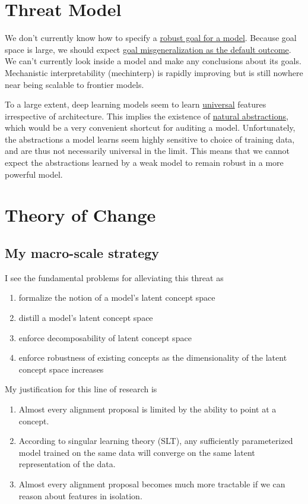 
\section{Threat Model}

We don't currently know how to specify a \hyperlink{https://arbital.com/p/diamond_maximizer/}{robust goal for a model}.
Because goal space is large, we should expect
\hyperlink{https://www.lesswrong.com/s/r9tYkB2a8Fp4DN8yB/p/FkgsxrGf3QxhfLWHG}{goal misgeneralization as the default outcome}.
We can't currently look inside a model and make any conclusions about its goals.
Mechanistic interpretability (mechinterp) is rapidly improving but is still nowhere near being scalable to frontier models.

To a large extent, deep learning models seem to learn \hyperlink{}{universal} features irrespective of architecture.
This implies the existence of
\hyperlink{https://www.lesswrong.com/posts/gvzW46Z3BsaZsLc25/natural-abstractions-key-claims-theorems-and-critiques-1}{natural abstractions},
which would be a very convenient shortcut for auditing a model.
Unfortunately, the abstractions a model learns seem highly sensitive to choice of training data, and are thus not necessarily universal in the limit.
This means that we cannot expect the abstractions learned by a weak model to remain robust in a more powerful model.

\section{Theory of Change}
\label{sec:2}

\subsection{My macro-scale strategy}
I see the fundamental problems for alleviating this threat as

\begin{enumerate}
  \item formalize the notion of a model's latent concept space
  \item distill a model's latent concept space
  \item enforce decomposability of latent concept space
  \item enforce robustness of existing concepts as the dimensionality of the latent concept space increases
\end{enumerate}

My justification for this line of research is
\begin{enumerate}
\item Almost every alignment proposal is limited by the ability to point at a concept.
\item According to singular learning theory (SLT), any sufficiently parameterized model trained on the same data will converge on the same latent representation of the data.
\item Almost every alignment proposal becomes much more tractable if we can reason about features in isolation.
\end{enumerate}

